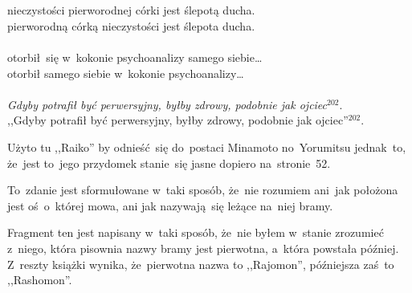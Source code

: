\documentclass[a4paper,11pt]{article}
\begin{document}
\noi \\
 \\
\Jest nieczystości pierworodnej córki jest ślepotą ducha. \\
\Pow pierworodną córką nieczystości jest ślepota ducha. \\
 \\
\Jest otorbił~się w~kokonie psychoanalizy samego siebie\ldots \\
\Pow otorbił samego siebie w~kokonie psychoanalizy\ldots \\
 \\
\Jest \emph{Gdyby potrafił być perwersyjny, byłby zdrowy, podobnie jak
  ojciec$^{ 202 }$}. \\
\Pow ,,Gdyby potrafił być perwersyjny, byłby zdrowy,
podobnie jak ojciec''$^{ 202 }$. \\

\vspace{\spaceTwo}





\newpage
{}

\vspace{\spaceThree}





\start {} Użyto tu ,,Raiko'' %
by odnieść~się do~postaci Minamoto no~Yorumitsu jednak~to, że~jest
to~jego przydomek stanie~się jasne dopiero na~stronie~52.

\vspace{\spaceFour}


\start {} To~zdanie jest sformułowane w~taki sposób,
że~nie rozumiem ani~jak położona jest oś~o~której mowa, ani jak
nazywają~się leżące na~niej bramy.

\vspace{\spaceFour}


\start {} Fragment ten jest napisany w~taki sposób,
że~nie byłem w~stanie zrozumieć z~niego, która pisownia nazwy bramy
jest pierwotna, a~która powstała później. Z~reszty książki wynika,
że~pierwotna nazwa to ,,Rajomon'', %
późniejsza zaś~to ,,Rashomon''. %
\end{document}
